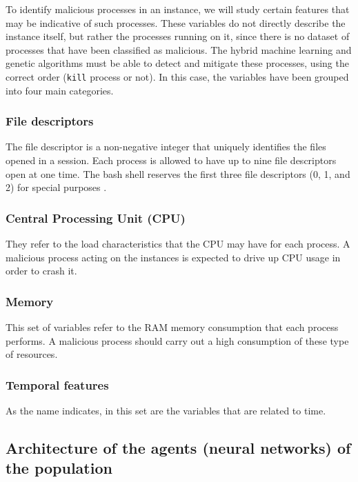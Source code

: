 \documentclass{iosart2c}
\begin{document}
To identify malicious processes in an instance, we will study certain features that may be indicative of such processes. These variables do not directly describe the instance itself, but rather the processes running on it, since there is no dataset of processes that have been classified as malicious. The hybrid machine learning and genetic algorithms must be able to detect and mitigate these processes, using the correct order (\texttt{kill} process or not). In this case, the variables have been grouped into four main categories.


\subsubsection{File descriptors}

The file descriptor is a non-negative integer that uniquely identifies the files opened in a session. Each process is allowed to have up to nine file descriptors open at one time. The bash shell reserves the first three file descriptors (0, 1, and 2) for special purposes \cite{shell_scripting2}. 

\subsubsection{Central Processing Unit (CPU)}

They refer to the load characteristics that the CPU may have for each process. A malicious process acting on the instances is expected to drive up CPU usage in order to crash it.\\

\subsubsection{Memory}

This set of variables refer to the RAM memory consumption that each process performs. A malicious process should carry out a high consumption of these type of resources. 


\subsubsection{Temporal features}

As the name indicates, in this set are the variables that are related to time.\\

\subsection{Architecture of the agents (neural networks) of the population} \label{arquitectura_agents}
\end{document}
